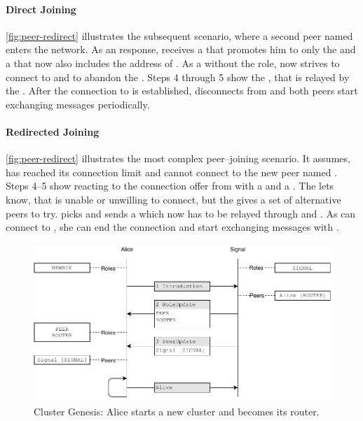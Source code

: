 \paragraph{Direct Joining}
\vref{fig:peer-redirect} illustrates the subsequent scenario, where a second peer named \bob enters the network. As an \introduction response, \bob receives a \roleUpdate that promotes him to only the \peerRole and a \peerUpdate that now also includes the address of \routerRole \alice. As a \peerRole without the \routerRole role, \bob now strives to connect to \alice and to abandon the \signal. Steps 4 through 5 show the \connectionNegotiation, that is relayed by the \signal. After the connection to \alice is established, \bob disconnects from \signal and both peers start exchanging \peerUpdate messages periodically.

\paragraph{Redirected Joining}
\vref{fig:peer-redirect} illustrates the most complex peer–joining scenario. It assumes, \alice has reached its connection limit and cannot connect to the new peer named \zoe. Steps 4–5 show \alice reacting to the connection offer from \zoe with a \rejection and a \peerUpdate. The \rejection lets \zoe know, that \alice is unable or unwilling to connect, but the \peerUpdate gives a set of alternative peers to try. \zoe picks \bob and sends a \connectionNegotiation which now has to be relayed through \signal and \alice. As \bob can connect to \zoe, she can end the \signal connection and start exchanging \peerUpdate messages with \bob.

\begin{figure}
\centering
\includegraphics[width=1\textwidth]{graphics/design/genesis.pdf}
\caption{Cluster Genesis: Alice starts a new cluster and becomes its router.}
\label{fig:genesis}
\end{figure}

